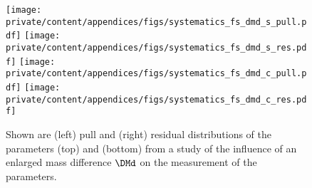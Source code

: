 \begin{figure}[h]
  \texttt{[image: private/content/appendices/figs/systematics\_fs\_dmd\_s\_pull.pdf]}\hfill
  \texttt{[image: private/content/appendices/figs/systematics\_fs\_dmd\_s\_res.pdf]}
  \texttt{[image: private/content/appendices/figs/systematics\_fs\_dmd\_c\_pull.pdf]}\hfill
  \texttt{[image: private/content/appendices/figs/systematics\_fs\_dmd\_c\_res.pdf]}
\caption{Shown are (left) pull and (right) residual distributions of the
parameters (top) \SJpsiKS and (bottom) \CJpsiKS from a \ToyMC study of the
influence of an enlarged mass difference $\DMd$ on the measurement
of the \CP parameters.}
\label{fig:app:measurement_of_sin2beta:systematics:systematics:further_studies:mass_difference}
\end{figure}
